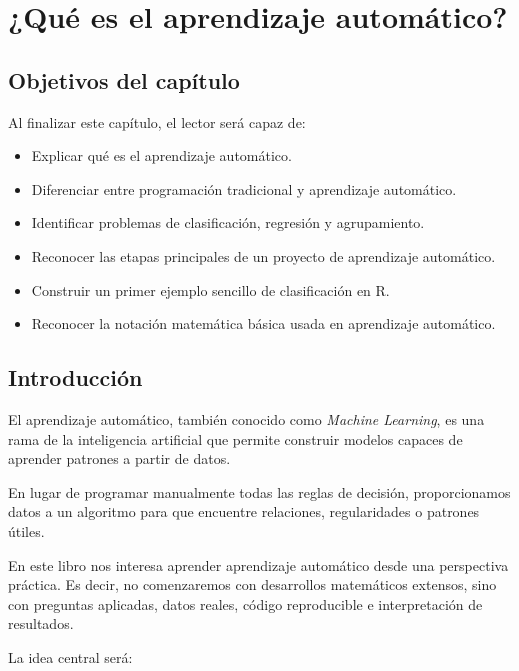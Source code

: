 \documentclass[
  11pt,
  letterpaper,
]{book}
\providecommand{\tightlist}{%
  \setlength{\itemsep}{0pt}\setlength{\parskip}{0pt}}
\begin{document}

\chapter{¿Qué es el aprendizaje
automático?}\label{quuxe9-es-el-aprendizaje-automuxe1tico}

\section{Objetivos del capítulo}\label{objetivos-del-capuxedtulo}

Al finalizar este capítulo, el lector será capaz de:

\begin{itemize}
\tightlist
\item
  Explicar qué es el aprendizaje automático.
\item
  Diferenciar entre programación tradicional y aprendizaje automático.
\item
  Identificar problemas de clasificación, regresión y agrupamiento.
\item
  Reconocer las etapas principales de un proyecto de aprendizaje
  automático.
\item
  Construir un primer ejemplo sencillo de clasificación en R.
\item
  Reconocer la notación matemática básica usada en aprendizaje
  automático.
\end{itemize}

\section{Introducción}\label{introducciuxf3n}

El aprendizaje automático, también conocido como \emph{Machine
Learning}, es una rama de la inteligencia artificial que permite
construir modelos capaces de aprender patrones a partir de datos.

En lugar de programar manualmente todas las reglas de decisión,
proporcionamos datos a un algoritmo para que encuentre relaciones,
regularidades o patrones útiles.

En este libro nos interesa aprender aprendizaje automático desde una
perspectiva práctica. Es decir, no comenzaremos con desarrollos
matemáticos extensos, sino con preguntas aplicadas, datos reales, código
reproducible e interpretación de resultados.

La idea central será:
\end{document}
